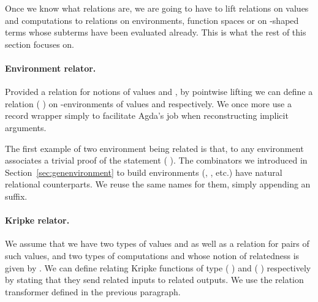 \begin{minipage}{\textwidth}
\begin{minipage}[t]{0.65\textwidth}
\end{minipage}
\begin{minipage}[t]{0.25\textwidth}
\end{minipage}
\end{minipage}

Once we know what relations are, we are going to have to lift relations on values
and computations to relations on environments,  function spaces or
on -shaped terms whose subterms have been evaluated already.
This is what the rest of this section focuses on.

\paragraph{Environment relator.}
Provided a relation  for notions of values  and , by
pointwise lifting we can define a relation {(  )} on
-environments of values  and  respectively. We once more
use a record wrapper simply to facilitate Agda's job when reconstructing
implicit arguments.

\begin{agdasnippet}
\end{agdasnippet}

The first example of two environment being related is  that, to any
environment  associates a trivial proof of the statement
{(    )}.
The combinators we introduced in Section~\ref{sec:genenvironment} to build environments
(, , etc.) have natural relational counterparts. We reuse the same
names for them, simply appending an  suffix.

\paragraph{Kripke relator.}
We assume that we have two types of values  and 
as well as a relation  for pairs of such values, and two types of computations
 and  whose notion of relatedness is given by . We can define
 relating Kripke functions of type
{(  )} and {(  )}
respectively by stating that they send related inputs
to related outputs. We use the relation transformer  defined in the previous
paragraph.


